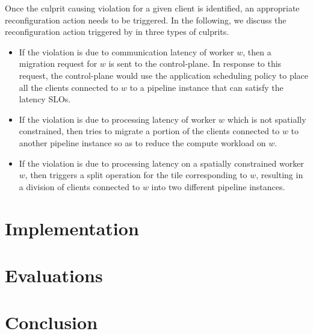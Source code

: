\par Once the culprit causing violation for a given client is identified, an appropriate reconfiguration action needs to be triggered. In the following, we discuss the reconfiguration action triggered by \oneedge{} in three types of culprits.
\begin{itemize}
\item If the violation is due to communication latency of worker $w$, then a migration request for $w$ is sent to the control-plane. In response to this request, the control-plane would use the application scheduling policy to place all the clients connected to $w$ to a pipeline instance that can satisfy the latency SLOs.
\item If the violation is due to processing latency of worker $w$ which is not spatially constrained, then \oneedge{} tries to migrate a portion of the clients connected to $w$ to another pipeline instance so as to reduce the compute workload on $w$.
\item If the violation is due to processing latency on a spatially constrained worker $w$, then \oneedge{} triggers a split operation for the tile corresponding to $w$, resulting in a division of clients connected to $w$ into two different pipeline instances.
\end{itemize}
\section{Implementation}

\section{Evaluations}

\section{Conclusion}